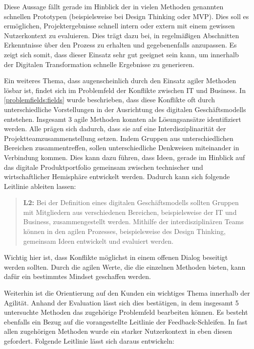 Diese Aussage fällt gerade im Hinblick der in vielen Methoden genannten schnellen Prototypen (beispielsweise bei Design Thinking oder MVP). Dies soll es ermöglichen, Projektergebnisse schnell intern oder extern mit einem gewissen Nutzerkontext zu evaluieren. Dies trägt dazu bei, in regelmäßigen Abschnitten Erkenntnisse über den Prozess zu erhalten und gegebenenfalls anzupassen. Es zeigt sich somit, dass dieser Einsatz sehr gut geeignet sein kann, um innerhalb der Digitalen Transformation schnelle Ergebnisse zu generieren.

Ein weiteres Thema, dass augenscheinlich durch den Einsatz agiler Methoden lösbar ist, findet sich im Problemfeld der Konflikte zwischen IT und Business. In \ref{problemfields:fields} wurde beschrieben, dass diese Konflikte oft durch unterschiedliche Vorstellungen in der Ausrichtung des digitalen Geschäftsmodells entstehen. Insgesamt 3 agile Methoden konnten als Lösungsansätze identifiziert werden. Alle prägen sich dadurch, dass sie auf eine Interdisziplinarität der Projektteamzusammenstellung setzen. Indem Gruppen aus unterschiedlichen Bereichen zusammentreffen, sollen unterschiedliche Denkweisen miteinander in Verbindung kommen. Dies kann dazu führen, dass Ideen, gerade im Hinblick auf das digitale Produktportfolio gemeinsam zwischen technischer und wirtschaftlicher Hemisphäre entwickelt werden. Dadurch kann sich folgende Leitlinie ableiten lassen:

\begin{quote}
	\textbf{L2:} Bei der Definition eines digitalen Geschäftsmodells sollten Gruppen mit Mitgliedern aus verschiedenen Bereichen, beispielsweise der IT und Business, zusammengestellt werden. Mithilfe der interdisziplinären Teams können in den agilen Prozesses, beispielsweise des Design Thinking, gemeinsam Ideen entwickelt und evaluiert werden.
\end{quote}

Wichtig hier ist, dass Konflikte möglichst in einem offenen Dialog beseitigt werden sollten. Durch die agilen Werte, die die einzelnen Methoden bieten, kann dafür ein bestimmtes Mindset geschaffen werden.

Weiterhin ist die Orientierung auf den Kunden ein wichtiges Thema innerhalb der Agilität. Anhand der Evaluation lässt sich dies bestätigen, in dem insgesamt 5 untersuchte Methoden das zugehörige Problemfeld bearbeiten können. Es besteht ebenfalls ein Bezug auf die vorangestellte Leitlinie der Feedback-Schleifen. In fast allen zugehörigen Methoden wurde ein starker Nutzerkontext in eben diesen gefordert. Folgende Leitlinie lässt sich daraus entwickeln:

